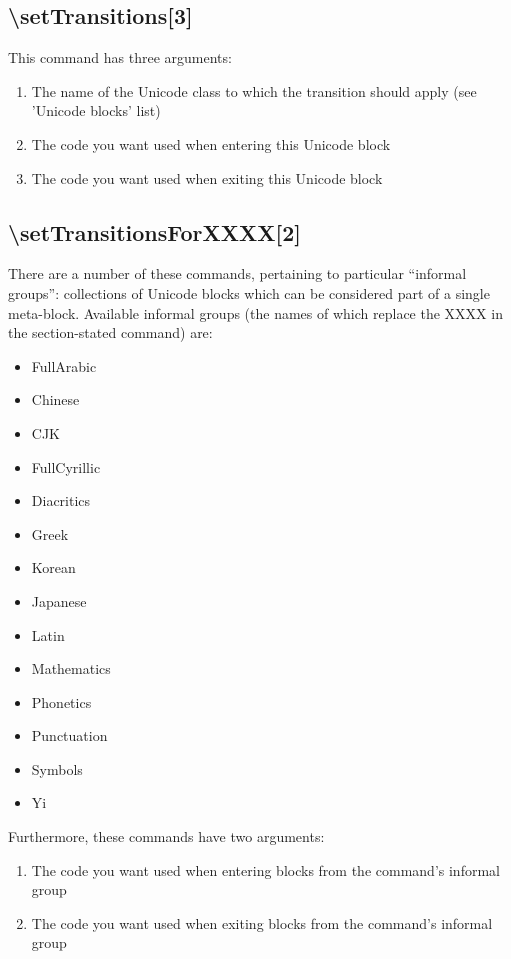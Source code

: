 ﻿\documentclass{article}
\newenvironment{itemlist}{%
  \begin{itemize}
	\setlength{\itemsep}{0pt}
	\setlength{\parsep}{0pt}
	\setlength{\topsep}{0pt}
	\setlength{\partopsep}{0pt}
	\setlength{\parskip}{0pt}
	\setlength{\labelsep}{5pt}}%
{
  \end{itemize}}
\newenvironment{numberlist}{%
  \begin{enumerate}
	\setlength{\itemsep}{0pt}
	\setlength{\parsep}{0pt}
	\setlength{\topsep}{0pt}
	\setlength{\partopsep}{0pt}
	\setlength{\parskip}{0pt}
	\setlength{\labelsep}{5pt}}%
{
  \end{enumerate}}
\begin{document}
		\subsection{\textbackslash setTransitions[3]}
		
			This command has three arguments:	
		
			\begin{numberlist}
				\item The name of the Unicode class to which the transition should apply (see 'Unicode blocks' list)
				\item The code you want used when entering this Unicode block
				\item The code you want used when exiting this Unicode block
			\end{numberlist}

		\subsection{\textbackslash setTransitionsForXXXX[2]}

			There are a number of these commands, pertaining to particular “informal groups”: collections of Unicode blocks which can be considered part of a single meta-block. Available informal groups (the names of which replace the XXXX in the section-stated command) are:
			
			\begin{itemlist}
				\item FullArabic
				\item Chinese
				\item CJK
				\item FullCyrillic
				\item Diacritics
				\item Greek
				\item Korean
				\item Japanese
				\item Latin
				\item Mathematics
				\item Phonetics
				\item Punctuation
				\item Symbols
				\item Yi
			\end{itemlist}
			
			Furthermore, these commands have two arguments:
			
			\begin{numberlist}
				\item The code you want used when entering blocks from the command's informal group
				\item The code you want used when exiting blocks from the command's informal group
			\end{numberlist}
		
\end{document}
